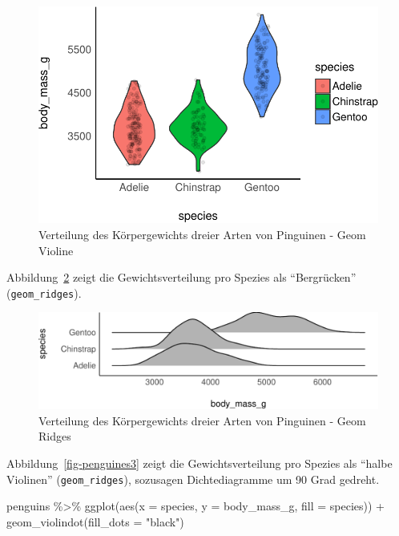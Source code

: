 \documentclass[
  a4paper,
  DIV=11]{scrreprt}
\newenvironment{Shaded}{\begin{snugshade}}{\end{snugshade}}
\newcommand{\AttributeTok}[1]{\textcolor[rgb]{0.40,0.45,0.13}{#1}}
\newcommand{\FunctionTok}[1]{\textcolor[rgb]{0.28,0.35,0.67}{#1}}
\newcommand{\NormalTok}[1]{\textcolor[rgb]{0.00,0.23,0.31}{#1}}
\newcommand{\SpecialCharTok}[1]{\textcolor[rgb]{0.37,0.37,0.37}{#1}}
\newcommand{\StringTok}[1]{\textcolor[rgb]{0.13,0.47,0.30}{#1}}
\theoremstyle{definition}
\theoremstyle{remark}
\begin{document}
\begin{figure}

{\centering \includegraphics{./metrische-AV_files/figure-pdf/fig-penguines1-1.pdf}

}

\caption{\label{fig-penguines1}Verteilung des Körpergewichts dreier
Arten von Pinguinen - Geom Violine}

\end{figure}

Abbildung~\ref{fig-penguines2} zeigt die Gewichtsverteilung pro Spezies
als ``Bergrücken'' (\texttt{geom\_ridges}).

\begin{figure}

{\centering \includegraphics{./metrische-AV_files/figure-pdf/fig-penguines2-1.pdf}

}

\caption{\label{fig-penguines2}Verteilung des Körpergewichts dreier
Arten von Pinguinen - Geom Ridges}

\end{figure}

Abbildung~\ref{fig-penguines3} zeigt die Gewichtsverteilung pro Spezies
als ``halbe Violinen'' (\texttt{geom\_ridges}), sozusagen
Dichtediagramme um 90 Grad gedreht.

\begin{Shaded}
\begin{Highlighting}[]
\NormalTok{penguins }\SpecialCharTok{\%\textgreater{}\%} 
  \FunctionTok{ggplot}\NormalTok{(}\FunctionTok{aes}\NormalTok{(}\AttributeTok{x =}\NormalTok{ species, }\AttributeTok{y =}\NormalTok{ body\_mass\_g, }\AttributeTok{fill =}\NormalTok{ species)) }\SpecialCharTok{+}
  \FunctionTok{geom\_violindot}\NormalTok{(}\AttributeTok{fill\_dots =} \StringTok{"black"}\NormalTok{)}
\end{Highlighting}
\end{Shaded}
\end{document}
